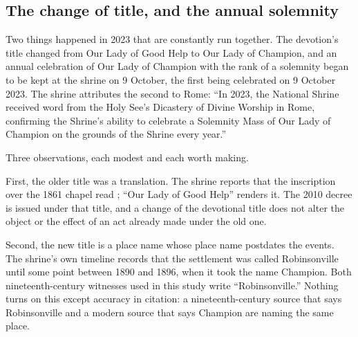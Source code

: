 \subsection{The change of title, and the annual solemnity}

Two things happened in 2023 that are constantly run together. The
devotion's title changed from Our Lady of Good Help to Our Lady of
Champion, and an annual celebration of Our Lady of Champion with the
rank of a solemnity began to be kept at the shrine on 9 October, the
first being celebrated on 9 October 2023. The shrine attributes the
second to Rome: ``In 2023, the National Shrine received word from the
Holy See's Dicastery of Divine Worship in Rome, confirming the Shrine's
ability to celebrate a Solemnity Mass of Our Lady of Champion on the
grounds of the Shrine every year.''

Three observations, each modest and each worth making.

First, the older title was a translation. The shrine reports that the
inscription over the 1861 chapel read ; ``Our Lady of Good Help'' renders it. The 2010 decree is
issued under that title, and a change of the devotional title does not
alter the object or the effect of an act already made under the old
one.

Second, the new title is a place name whose place name postdates the
events. The shrine's own timeline records that the settlement was
called Robinsonville until some point between 1890 and 1896, when it
took the name Champion. Both nineteenth-century witnesses used in this
study write ``Robinsonville.'' Nothing turns on this except accuracy in
citation: a nineteenth-century source that says Robinsonville and a
modern source that says Champion are naming the same place.

